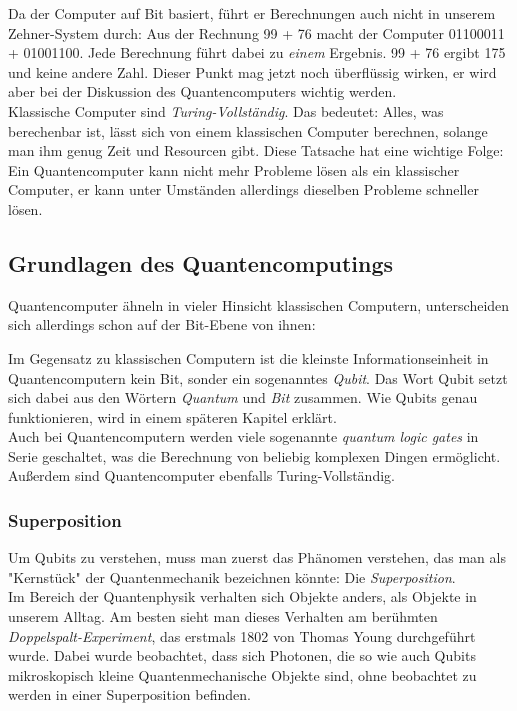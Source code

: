 \documentclass[12pt]{IEEEtran}
\begin{document}
Da der Computer auf Bit basiert, führt er Berechnungen auch nicht in unserem Zehner-System durch: Aus der Rechnung 99 + 76 macht der Computer 01100011 + 01001100. Jede Berechnung führt dabei zu \textit{einem} Ergebnis. 99 + 76 ergibt 175 und keine andere Zahl. Dieser Punkt mag jetzt noch überflüssig wirken, er wird aber bei der Diskussion des Quantencomputers wichtig werden. \\

Klassische Computer sind \textit{Turing-Vollständig}. Das bedeutet: Alles, was berechenbar ist, lässt sich von einem klassischen Computer berechnen, solange man ihm genug Zeit und Resourcen gibt. \cite{TuringWiki} Diese Tatsache hat eine wichtige Folge: \\
Ein Quantencomputer kann nicht mehr Probleme lösen als ein klassischer Computer, er kann unter Umständen allerdings dieselben Probleme schneller lösen.

\subsection{Grundlagen des Quantencomputings}

Quantencomputer ähneln in vieler Hinsicht klassischen Computern, unterscheiden sich allerdings schon auf der Bit-Ebene von ihnen:

Im Gegensatz zu klassischen Computern ist die kleinste Informationseinheit in Quantencomputern kein Bit, sonder ein sogenanntes \textit{Qubit}. Das Wort Qubit setzt sich dabei aus den Wörtern \textit{Quantum} und \textit{Bit} zusammen. \cite{quantum1998} Wie Qubits genau funktionieren, wird in einem späteren Kapitel erklärt. \\

Auch bei Quantencomputern werden viele sogenannte \textit{quantum logic gates} in Serie geschaltet, was die Berechnung von beliebig komplexen Dingen ermöglicht. Außerdem sind Quantencomputer ebenfalls Turing-Vollständig. \cite{quantum1998}

\subsubsection{Superposition}

Um Qubits zu verstehen, muss man zuerst das Phänomen verstehen, das man als "Kernstück" der Quantenmechanik bezeichnen könnte: Die \textit{Superposition}.\\

Im Bereich der Quantenphysik verhalten sich Objekte anders, als Objekte in unserem Alltag. Am besten sieht man dieses Verhalten am berühmten \textit{Doppelspalt-Experiment}, das erstmals 1802 von Thomas Young durchgeführt wurde. Dabei wurde beobachtet, dass sich Photonen, die so wie auch Qubits mikroskopisch kleine Quantenmechanische Objekte sind, ohne beobachtet zu werden in einer Superposition befinden. \cite{Lemmer2017} \\
\end{document}

